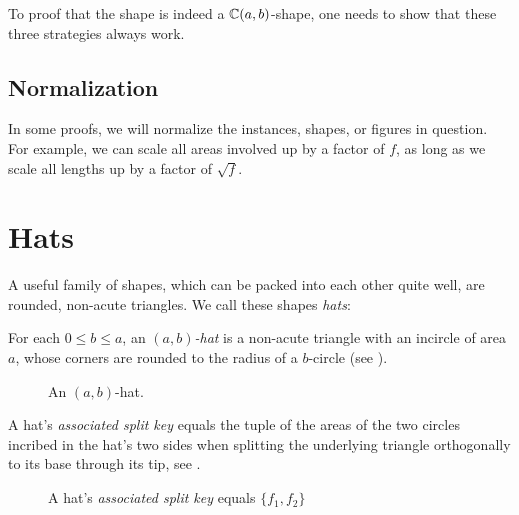 \documentclass[%
    a4paper,              %
    style=screen,          %
    bibliography=totoc,   %
    nexus,                %
    lnum,                 %
    extramargin,          %
]{tubsbook}
\newcommand\defaulta{30}
\newcommand\defaultb{40}
\newcommand\defaultr{0.2}
\begin{document}
To proof that the shape is indeed a $\mathbb{C}(a,b)$-shape, one needs to show that these three strategies always work.

\section{Normalization}

In some proofs, we will normalize the instances, shapes, or figures in question. For example, we can scale all areas involved up by a factor of $f$, as long as we scale all lengths up by a factor of $\sqrt{f}$.

\chapter{Hats}

A useful family of shapes, which can be packed into each other quite well, are rounded, non-acute triangles. We call these shapes \emph{hats}:

\begin{definition}
    For each $0 \le b \le a$, an \emph{$(a,b)$-hat} is a non-acute triangle with an incircle of area $a$, whose corners are rounded to the radius of a $b$-circle (see ).
\end{definition}

\begin{figure}[htbp!]
    \centering


    \caption{An $(a,b)$-hat.}
    \label{fig:hat}
\end{figure}

\begin{definition}
    A hat's \emph{associated split key} equals the tuple of the areas of the two circles incribed in the hat's two sides when splitting the underlying triangle orthogonally to its base through its tip, see .
\end{definition}

\begin{figure}[htbp!]
    \centering


    \caption{A hat's \emph{associated split key} equals $\{f_1, f_2\}$}
    \label{fig:hatf}
\end{figure}
\end{document}
